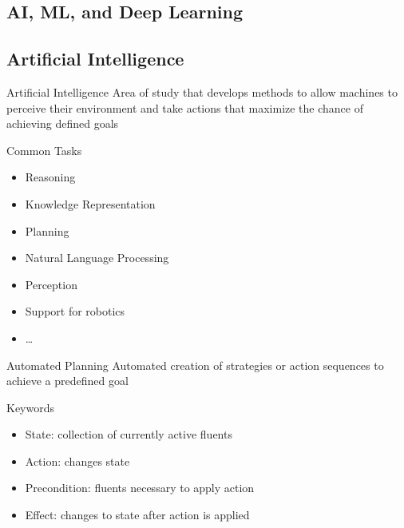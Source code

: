\subsection{AI, ML, and Deep Learning}
\begin{frame}{\insertsubsection}
	\centering{} %
\end{frame}


\subsection{Artificial Intelligence}
\begin{frame}{\insertsubsection{}  }
	\begin{fancycolumns}[animation=none]
		\begin{definition}{Artificial Intelligence}
			Area of study that develops methods to allow machines to perceive their environment and take actions that maximize the chance of achieving defined goals
		\end{definition} \pause
		\begin{note}{Common Tasks}
			\begin{itemize}
				\item Reasoning
				\item Knowledge Representation
				\item Planning
				\item Natural Language Processing
				\item Perception
				\item Support for robotics
				\item \dots
			\end{itemize}
		\end{note} \pause
		\nextcolumn
		\begin{definition}{Automated Planning}
			Automated creation of strategies or action sequences to achieve a predefined goal
		\end{definition} \pause
		\begin{example}{Keywords}
			\begin{itemize}
				\item State: collection of currently active fluents
				\item Action: changes state
				\item Precondition: fluents necessary to apply action
				\item Effect: changes to state after action is applied

\end{itemize}
\end{example}
\end{fancycolumns}
\end{frame}
